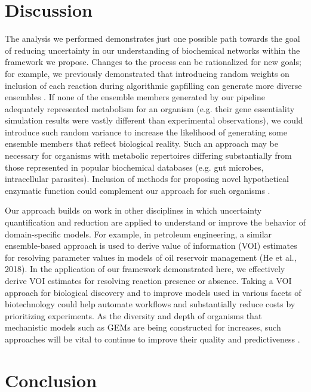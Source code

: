 \documentclass[11pt,twocolumn,notitlepage,openany,twoside]{book}
\begin{document}
\begin{refsection}
\section{Discussion}

The analysis we performed demonstrates just one possible path towards the goal of reducing uncertainty in our understanding of biochemical networks within the framework we propose. Changes to the process can be rationalized for new goals; for example, we previously demonstrated that introducing random weights on inclusion of each reaction during algorithmic gapfilling can generate more diverse ensembles \cite{Biggs2017-md}. If none of the ensemble members generated by our pipeline adequately represented metabolism for an organism (e.g. their gene essentiality simulation results were vastly different than experimental observations), we could introduce such random variance to increase the likelihood of generating some ensemble members that reflect biological reality. Such an approach may be necessary for organisms with metabolic repertoires differing substantially from those represented in popular biochemical databases (e.g. gut microbes, intracellular parasites). Inclusion of methods for proposing novel hypothetical enzymatic function could complement our approach for such organisms \cite{Hatzimanikatis2005-wy,Jeffryes2015-bm}.

Our approach builds on work in other disciplines in which uncertainty quantification and reduction are applied to understand or improve the behavior of domain-specific models. For example, in petroleum engineering, a similar ensemble-based approach is used to derive value of information (VOI) estimates for resolving parameter values in models of oil reservoir management \cite{He2018-nb}(He et al., 2018). In the application of our framework demonstrated here, we effectively derive VOI estimates for resolving reaction presence or absence. Taking a VOI approach for biological discovery and to improve models used in various facets of biotechnology could help automate workflows and substantially reduce costs by prioritizing experiments. As the diversity and depth of organisms that mechanistic models such as GEMs are being constructed for increases, such approaches will be vital to continue to improve their quality and predictiveness \cite{Magnusdottir2017-dk,Monk2014-fa}.

\section{Conclusion}


\end{refsection}
\end{document}

